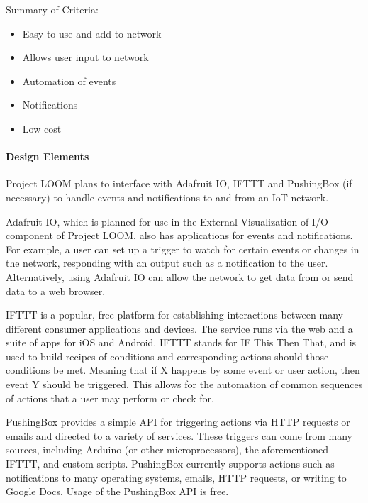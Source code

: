 \documentclass[onecolumn, draftclsnofoot,10pt, compsoc]{IEEEtran}
\begin{document}
    Summary of Criteria:
    \begin{itemize}[noitemsep,topsep=-10pt]
        \item Easy to use and add to network
        \item Allows user input to network
        \item Automation of events
        \item Notifications
        \item Low cost
    \end{itemize}

\paragraph{Design Elements}
    Project LOOM plans to interface with Adafruit IO, IFTTT and PushingBox (if necessary) to handle events and notifications to and from an IoT network.

    Adafruit IO, which is planned for use in the External Visualization of I/O component of Project LOOM, also has applications for events and notifications. For example, a user can set up a trigger to watch for certain events or changes in the network, responding with an output such as a notification to the user. Alternatively, using Adafruit IO can allow the network to get data from or send data to a web browser. \cite{adafruitio}

    IFTTT is a popular, free platform for establishing interactions between many different consumer applications and devices. The service runs via the web and a suite of apps for iOS and Android. IFTTT stands for IF This Then That, and is used to build recipes of conditions and corresponding actions should those conditions be met. Meaning that if X happens by some event or user action, then event Y should be triggered. This allows for the automation of common sequences of actions that a user may perform or check for. \cite{ifttt}

    PushingBox provides a simple API for triggering actions via HTTP requests or emails and directed to a variety of services. These triggers can come from many sources, including Arduino (or other microprocessors), the aforementioned IFTTT, and custom scripts. PushingBox currently supports actions such as notifications to many operating systems, emails, HTTP requests, or writing to Google Docs. Usage of the PushingBox API is free. \cite{pushingbox}
\end{document}
